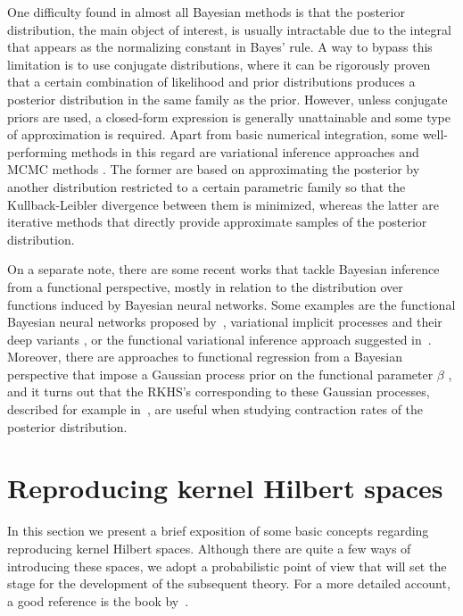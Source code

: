 One difficulty found in almost all Bayesian methods is that the posterior distribution, the main object of interest, is usually intractable due to the integral that appears as the normalizing constant in Bayes' rule. A way to bypass this limitation is to use conjugate distributions, where it can be rigorously proven that a certain combination of likelihood and prior distributions produces a posterior distribution in the same family as the prior. However, unless conjugate priors are used, a closed-form expression is generally unattainable and some type of approximation is required. Apart from basic numerical integration, some well-performing methods in this regard are variational inference approaches \citep[e.g.][]{blei2017variational} and MCMC methods \citep[e.g.][]{brooks2011handbook}. The former are based on approximating the posterior by another distribution restricted to a certain parametric family so that the Kullback-Leibler divergence between them is minimized, whereas the latter are iterative methods that directly provide approximate samples of the posterior distribution.

On a separate note, there are some recent works that tackle Bayesian inference from a functional perspective, mostly in relation to the distribution over functions induced by Bayesian neural networks. Some examples are the functional Bayesian neural networks proposed by~\citet{sun2019functional}, variational implicit processes \citep{ma2019variational} and their deep variants \citep{ortega2022deep}, or the functional variational inference approach suggested in~\citet{ma2021functional}. Moreover, there are approaches to functional regression from a Bayesian perspective that impose a Gaussian process prior on the functional parameter \(\beta\) \citep[e.g][]{lian2016posterior}, and it turns out that the RKHS's corresponding to these Gaussian processes, described for example in~\citet{van2008reproducing}, are useful when studying contraction rates of the posterior distribution.

\section{Reproducing kernel Hilbert spaces}\label{sec:rkhs}

In this section we present a brief exposition of some basic concepts regarding reproducing kernel Hilbert spaces. Although there are quite a few ways of introducing these spaces, we adopt a probabilistic point of view that will set the stage for the development of the subsequent theory. For a more detailed account, a good reference is the book by~\citet{berlinet2004reproducing}.

